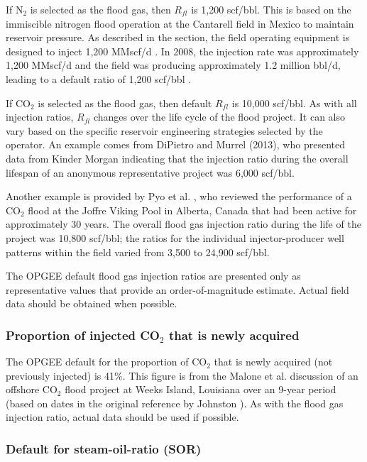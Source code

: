 \documentclass[11pt]{report}
\begin{document}
If N$_2$ is selected as the flood gas, then $R_{fl}$ is 1,200 scf/bbl. This is based on the immiscible nitrogen flood operation at the Cantarell field in Mexico to maintain reservoir pressure. As described in the  section, the field operating equipment is designed to inject 1,200 MMscf/d \cite{Kuo2001}. In 2008, the injection rate was approximately 1,200 MMscf/d and the field was producing approximately 1.2 million bbl/d, leading to a default ratio of 1,200 scf/bbl \cite{guzmann2014review}.

If CO$_2$ is selected as the flood gas, then default $R_{fl}$ is 10,000 scf/bbl. As with all injection ratios, $R_{fl}$  changes over the life cycle of the flood project. It can also vary based on the specific reservoir engineering strategies selected by the operator.  An example comes from DiPietro and Murrel (2013), who presented data from Kinder Morgan indicating that the injection ratio during the overall lifespan of an anonymous representative project was 6,000 scf/bbl. 

Another example is provided by Pyo et al. \cite{pyo2003co2}, who reviewed the performance of a CO$_2$ flood at the Joffre Viking Pool in Alberta, Canada that had been active for approximately 30 years. The overall flood gas injection ratio during the life of the project was 10,800 scf/bbl; the ratios for the individual injector-producer well patterns within the field varied from 3,500 to 24,900 scf/bbl. 

The OPGEE default flood gas injection ratios are presented only as representative values that provide an order-of-magnitude estimate. Actual field data should be obtained when possible.

\subsubsection{Proportion of injected CO$_2$ that is newly acquired}
The OPGEE default for the proportion of CO$_2$ that is newly acquired (not previously injected) is 41\%. This figure is from the Malone et al. \cite{NETL2014} discussion of an offshore CO$_2$ flood project at Weeks Island, Louisiana over an 9-year period (based on dates in the original reference by Johnston \cite{johnston1988weeks}). As with the flood gas injection ratio, actual data should be used if possible. 

\subsubsection{Default for steam-oil-ratio (SOR)}
\end{document}
